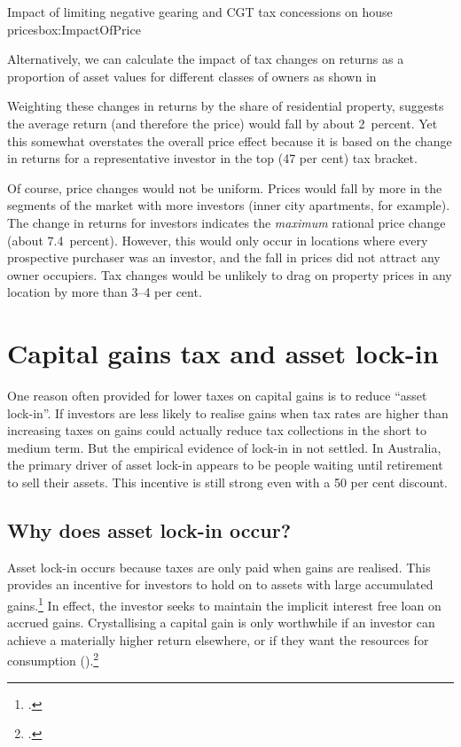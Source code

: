 \documentclass{grattanAlpha}
\begin{document}
\begin{bigbox*}{Impact of limiting negative gearing {and CGT} tax concessions on house prices}{box:ImpactOfPrice}
\begin{table}[H]
{}

\end{table}

Alternatively, we can calculate the impact of tax changes on returns as a proportion of asset values for different classes of owners as shown in

Weighting these changes in returns by the share of residential property, suggests the average return (and therefore the price) would fall by about 2~percent. Yet this somewhat overstates the overall price effect because it is based on the change in returns for a representative investor in the top (47 per cent) tax bracket.

Of course, price changes would not be uniform. Prices would fall by more in the segments of the market with more investors (inner city apartments, for example). The change in returns for investors indicates the \emph{maximum} rational price change (about 7.4~percent). However, this would only occur in locations where every prospective purchaser was an investor, and the fall in prices did not attract any owner occupiers. Tax changes would be unlikely to drag on property prices in any location by more than 3--4 per cent.

\end{bigbox*}

\chapter{Capital gains tax and asset lock-in}\label{appendix:CGT-asset-lock-in}
One reason often provided for lower taxes on capital gains is to reduce ``asset lock-in''. If investors are less likely to realise gains when tax rates are higher than increasing taxes on gains could actually reduce tax collections in the short to medium term. But the empirical evidence of lock-in in not settled. In Australia, the primary driver of asset lock-in appears to be people waiting until retirement to sell their assets. This incentive is still strong even with a 50 per cent discount. 

\section{Why does asset lock-in occur?}
Asset lock-in occurs because taxes are only paid when gains are realised. This provides an incentive for investors to hold on to assets with large accumulated gains.\footcite{Burman2009}  In effect, the investor seeks to maintain the implicit interest free loan on accrued gains. Crystallising a capital gain is only worthwhile if an investor can achieve a materially higher return elsewhere, or if they want the resources for consumption ().\footcite[][12]{Ingles2009a}   
\end{document}

